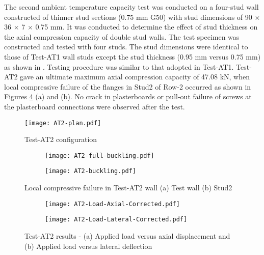 The second ambient temperature capacity test was conducted on a four-stud wall constructed of thinner stud sections (0.75 mm G50) with stud dimensions of 90 $\times$ 36 $\times$ 7 $\times$ 0.75 mm. It was conducted to determine the effect of stud thickness on the axial compression capacity of double stud walls. The test specimen was constructed and tested with four studs. The stud dimensions were identical to those of Test-AT1 wall studs except the stud thickness (0.95 mm versus 0.75 mm) as shown in . Testing procedure was similar to that adopted in Test-AT1. Test-AT2 gave an ultimate maximum axial compression capacity of 47.08 kN, when local compressive failure of the flanges in Stud2 of Row-2 occurred as shown in Figures \ref{fig:AT2-failure} (a) and (b). No crack in plasterboards or pull-out failure of screws at the plasterboard connections were observed after the test.  
\begin{figure}[!htbp]
	\centering
			\texttt{[image: AT2-plan.pdf]}\\
		\caption{Test-AT2 configuration}
		\label{fig:AT2-plan}
\end{figure}  
\begin{figure}[!htbp]
	\centering
	\begin{subfigure}[b]{0.4\textwidth}
		\centering
		\texttt{[image: AT2-full-buckling.pdf]}
		\caption{}
		\label{subfig:AT2-full-buckling}
	\end{subfigure}
	\begin{subfigure}[b]{0.4\textwidth}
		\centering
		\texttt{[image: AT2-buckling.pdf]}
		\caption{}
		\label{subfig:AT2-buckling}
	\end{subfigure}
	   \caption{Local compressive failure in Test-AT2 wall (a) Test wall (b) Stud2}
	   \label{fig:AT2-failure}
\end{figure}
\begin{figure}[!htbp]
	\centering
	\begin{subfigure}[b]{0.7\textwidth}
		\centering
		\texttt{[image: AT2-Load-Axial-Corrected.pdf]}
		\caption{}
		\label{subfig:AT2-Load-Axial-Corrected}
	\end{subfigure}
	\begin{subfigure}[b]{0.7\textwidth}
		\centering
		\texttt{[image: AT2-Load-Lateral-Corrected.pdf]}
		\caption{}
		\label{subfig:AT2-Load-Lateral-Corrected}
	\end{subfigure}
	   \caption{Test-AT2 results - (a) Applied load versus axial displacement and (b) Applied load versus lateral deflection}
	   \label{fig:AT2-results}
\end{figure}

